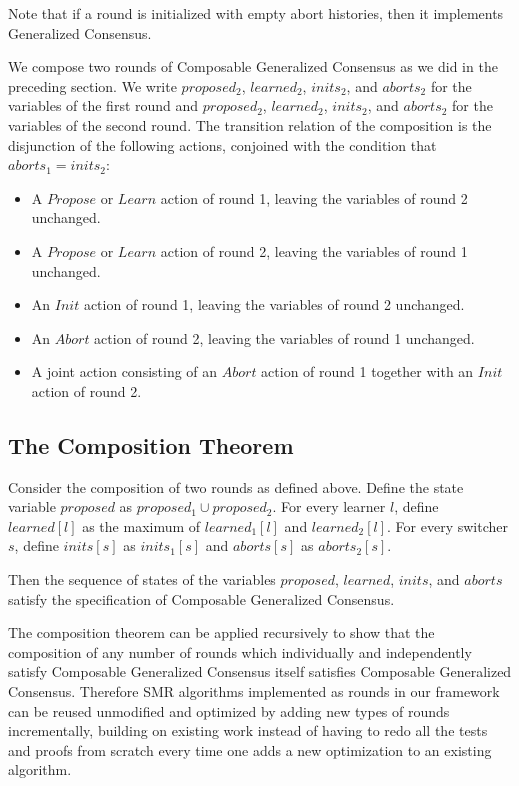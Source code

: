 \documentclass{llncs}
\begin{document}
Note that if a round is initialized with empty abort histories, then it implements Generalized Consensus.

We compose two rounds of Composable Generalized Consensus as we did in the preceding section.
We write $proposed_2$, $learned_2$, $inits_2$, and $aborts_2$ for the variables of the first round and  $proposed_2$, $learned_2$, $inits_2$, and $aborts_2$
for the variables of the second round.
The transition relation of the composition is the disjunction of the following actions, conjoined with the condition that $aborts_1=inits_2$:
\begin{itemize}
  \item A $Propose$ or $Learn$ action of round 1, leaving the variables of round 2 unchanged.
  \item A $Propose$ or $Learn$ action of round 2, leaving the variables of round 1 unchanged.
  \item An $Init$ action of round 1, leaving the variables of round 2 unchanged.
  \item An $Abort$ action of round 2, leaving the variables of round 1 unchanged.
  \item A joint action consisting of an $Abort$ action of round 1 together with an $Init$ action of round 2.
\end{itemize}

\subsection{The Composition Theorem}

\begin{theorem}
    \label{thm:comp}
Consider the composition of two rounds as defined above.
Define the state variable $proposed$ as $proposed_1 \cup proposed_2$. For every learner $l$, define 
$learned\left[ l \right]$ as the maximum of $learned_1\left[ l \right]$ and $learned_2\left[ l \right]$.
For every switcher $s$, define $inits\left[ s \right]$ as $inits_1\left[ s \right]$ and $aborts\left[ s \right]$ as $aborts_2\left[ s \right]$.

Then the sequence of states of the variables $proposed$, $learned$, $inits$, and $aborts$ satisfy the specification of Composable Generalized Consensus.
\end{theorem}

The composition theorem can be applied recursively to show that the composition of any number of rounds which individually and independently satisfy Composable Generalized Consensus itself satisfies Composable Generalized Consensus. 
Therefore SMR algorithms implemented as rounds in our framework can be reused unmodified and optimized by adding new types of rounds incrementally, building on existing work instead of having to redo all the tests and proofs from scratch every time one adds a new optimization to an existing algorithm.
\end{document}
